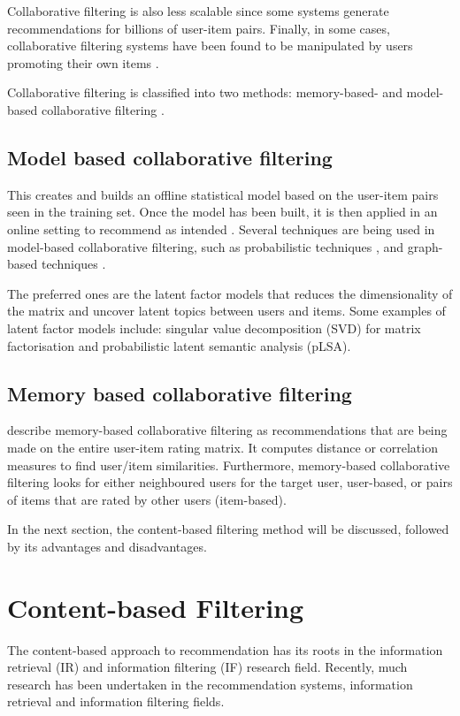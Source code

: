 Collaborative filtering is also less scalable since some systems generate recommendations for billions of user-item pairs. Finally, in some cases, collaborative filtering systems have been found to be manipulated by users promoting their own items \cite{resnick1994grouplens}.

Collaborative filtering is classified into two methods: memory-based- and model-based collaborative filtering \cite{naak2009multi}.

\subsection{Model based collaborative filtering} 

This creates and builds an offline statistical model based on the user-item pairs seen in the training set. Once the model has been built, it is then applied in an online setting to recommend as intended \cite{jannach2010recommender}. Several techniques are being used in model-based collaborative filtering, such as probabilistic techniques \cite{pavlov2004collaborative}, and graph- based techniques \cite{clements2009exploiting}.

The preferred ones are the latent factor models that reduces the dimensionality of the matrix and uncover latent topics between users and items. Some examples of latent factor models include: singular value decomposition (SVD) for matrix factorisation \cite{clements2009exploiting} and probabilistic latent semantic analysis (pLSA).


\subsection{Memory based collaborative filtering}
 describe memory-based collaborative filtering as recommendations that are being made on the entire user-item rating matrix. It computes distance or correlation measures to find user/item similarities. Furthermore, memory-based collaborative filtering looks for either neighboured users for the target user, user-based, or pairs of items that are rated by other users (item-based).

In the next section, the content-based filtering method will be discussed, followed by its advantages and disadvantages.

\section{Content-based Filtering}
The content-based approach to recommendation has its roots in the information retrieval (IR) and information filtering (IF) research field. Recently, much research has been undertaken in the recommendation systems, information retrieval and information filtering fields.

